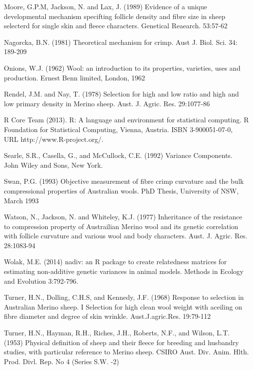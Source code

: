 \documentclass[titlepage]{article}  %
\begin{document}
\begin{thebibliography}{99}
Moore, G.P.M, Jackson, N. and Lax, J. (1989) Evidence of a unique developmental mechanism specifting follicle density and fibre size in sheep selecterd for single skin and fleece characters. Genetical Reaearch. 53:57-62

Nagorcka, B.N. (1981) Theoretical mechanism for crimp.
     Aust J. Biol. Sci. 34: 189-209

Onions, W.J. (1962) Wool: an introduction to its properties, varieties, uses
     and production. Ernest Benn limited, London, 1962

Rendel, J.M. and Nay, T. (1978) Selection for high and low ratio and high 
    and low primary density in Merino sheep. 
    Aust. J. Agric. Res. 29:1077-86

R Core Team (2013). R: A language and environment for statistical
  computing. R Foundation for Statistical Computing, Vienna, Austria.
  ISBN 3-900051-07-0, URL http://www.R-project.org/.

Searle, S.R., Casella, G., and McCullock, C.E. (1992) Variance Components.
    John Wiley and Sons, New York.


Swan, P.G. (1993) Objective measurement of fibre crimp curvature and the bulk compressional properties of Australian wools. PhD Thesis, University of NSW, March 1993 

Watson, N., Jackson, N. and Whiteley, K.J. (1977) Inheritance of the resistance
    to compression property of Austrailian Merino wool and its genetic 
    correlation with follicle curvature and various wool and body 
    characters. Aust. J. Agric. Res. 28:1083-94

Wolak, M.E. (2014) nadiv: an R package to create relatedness matrices for
    estimating non-additive genetic variances in animal models.
    Methods in Ecology and Evolution 3:792-796.

Turner, H.N., Dolling, C.H.S, and Kennedy, J.F. (1968) Response to selection in Australian Merino sheep. I Selection for high clean wool weight with aceiling on fibre diameter and degree of skin wrinkle. Aust.J.agric.Res. 19:79-112

Turner, H.N., Hayman, R.H., Riches, J.H., Roberts, N.F., and Wilson, L.T. (1953) Physical definition of sheep and their fleece for breeding and husbandry studies, with particular reference to Merino sheep. CSIRO Aust. Div. Anim. Hlth. Prod. Divl. Rep. No 4 (Series S.W. -2)

\end{thebibliography}
\end{document}

